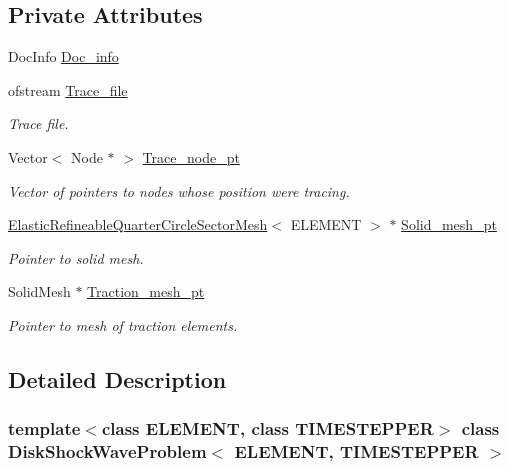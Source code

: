\subsection*{Private Attributes}
\begin{DoxyCompactItemize}
\item 
Doc\+Info \hyperlink{classDiskShockWaveProblem_a8e445e31a1067ebbd3bd667cc02e8662}{Doc\+\_\+info}
\item 
ofstream \hyperlink{classDiskShockWaveProblem_a8ec35b07dc6870e4d5b729288053c4fe}{Trace\+\_\+file}
\begin{DoxyCompactList}\small\item\em Trace file. \end{DoxyCompactList}\item 
Vector$<$ Node $\ast$ $>$ \hyperlink{classDiskShockWaveProblem_a7ab6db65bbf28185b238e84bbc16c1b8}{Trace\+\_\+node\+\_\+pt}
\begin{DoxyCompactList}\small\item\em Vector of pointers to nodes whose position we\textquotesingle{}re tracing. \end{DoxyCompactList}\item 
\hyperlink{classElasticRefineableQuarterCircleSectorMesh}{Elastic\+Refineable\+Quarter\+Circle\+Sector\+Mesh}$<$ E\+L\+E\+M\+E\+NT $>$ $\ast$ \hyperlink{classDiskShockWaveProblem_a6efbcb695e829d63f810a7a9bb5a81a4}{Solid\+\_\+mesh\+\_\+pt}
\begin{DoxyCompactList}\small\item\em Pointer to solid mesh. \end{DoxyCompactList}\item 
Solid\+Mesh $\ast$ \hyperlink{classDiskShockWaveProblem_a286fe7d51aa16f07f0444ae7c553f140}{Traction\+\_\+mesh\+\_\+pt}
\begin{DoxyCompactList}\small\item\em Pointer to mesh of traction elements. \end{DoxyCompactList}\end{DoxyCompactItemize}


\subsection{Detailed Description}
\subsubsection*{template$<$class E\+L\+E\+M\+E\+NT, class T\+I\+M\+E\+S\+T\+E\+P\+P\+ER$>$\newline
class Disk\+Shock\+Wave\+Problem$<$ E\+L\+E\+M\+E\+N\+T, T\+I\+M\+E\+S\+T\+E\+P\+P\+E\+R $>$}

